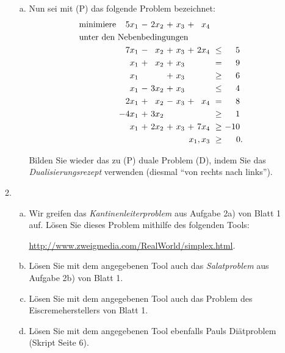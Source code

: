 \documentclass[11pt, a4paper]{article}
\begin{document}
\begin{enumerate}[\bfseries A:]
\begin{enumerate}[\bfseries 1.]
\begin{enumerate}[a)]
\item Nun sei mit (P) das folgende Problem bezeichnet:
\begin{align*}
\begin{alignedat}{6}
& \text{minimiere } & 5x_1 &\ - &\ 2x_2 &\ + &\ x_3 &\ + &\ x_4 & & \\
& \rlap{unter den Nebenbedingungen} & & & & & & & \\
&&  7x_1 &\ - &\  x_2 &\ + &\  x_3 &\ + &\ 2x_4 &\ \leq &\   5\ \\
&&   x_1 &\ + &\  x_2 &\ + &\  x_3 &    &       &\ =    &\   9\ \\
&&   x_1 &\   &\      &\ + &\  x_3 &    &       &\ \geq &\   6\ \\
&&   x_1 &\ - &\ 3x_2 &\ + &\  x_3 &    &       &\ \leq &\   4\ \\
&&  2x_1 &\ + &\  x_2 &\ - &\  x_3 &\ + &\  x_4 &\ =    &\   8\ \\
&& -4x_1 &\ + &\ 3x_2 &\   &\      &    &       &\ \geq &\   1\ \\
&&   x_1 &\ + &\ 2x_2 &\ + &\  x_3 &\ + &\ 7x_4 &\ \geq &\ -10\ \\
&& &&&&&& \llap{$x_1,x_3$} &\ \geq &\ 0.
\end{alignedat}
\end{align*}

Bilden Sie wieder das zu (P) duale Problem (D), indem Sie das \textit{Dualisierungsrezept} verwenden (diesmal \enquote{von rechts nach links}).

\end{enumerate}

\item \begin{enumerate}[a)]

\item Wir greifen das \textit{Kantinenleiterproblem} aus Aufgabe 2a) von Blatt 1 auf. Lösen Sie dieses Problem mithilfe des folgenden Tools:

\begin{center}
\url{http://www.zweigmedia.com/RealWorld/simplex.html}.
\end{center}

\item Lösen Sie mit dem angegebenen Tool auch das \textit{Salatproblem} aus Aufgabe 2b) von Blatt 1.

\item Lösen Sie mit dem angegebenen Tool auch das Problem des Eiscremeherstellers von Blatt 1.

\item Lösen Sie mit dem angegebenen Tool ebenfalls Pauls Diätproblem (Skript Seite 6).

\end{enumerate}

\end{enumerate}


\end{enumerate}
\end{document}
